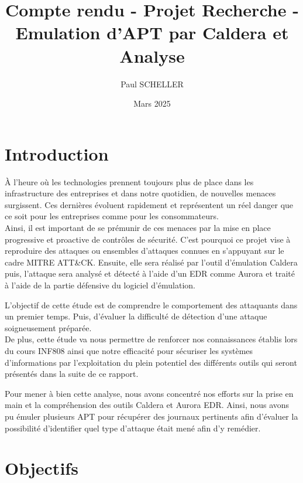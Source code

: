 \documentclass[12pt,letterpaper]{article}
\title{Compte rendu - Projet Recherche - Emulation d'APT par Caldera et Analyse}
\author{Paul SCHELLER}
\date{Mars 2025}
\begin{document}



\newpage
\renewcommand{\contentsname}{Plan de l'étude}
\tableofcontents


\newpage
\section{Introduction}

À l'heure où les technologies prennent toujours plus de place dans les infrastructure des entreprises et dans notre quotidien, de nouvelles menaces surgissent. Ces dernières évoluent rapidement et représentent un réel danger que ce soit pour les entreprises comme pour les consommateurs. \\
Ainsi, il est important de se prémunir de ces menaces par la mise en place progressive et proactive de contrôles de sécurité. C'est pourquoi ce projet vise à reproduire des attaques ou ensembles d'attaques connues en s'appuyant sur le cadre MITRE ATT\&CK. Ensuite, elle sera réalisé par l'outil d'émulation Caldera puis, l'attaque sera analysé et détecté à l'aide d'un EDR comme Aurora et traité à l'aide de la partie défensive du logiciel d'émulation.

\bigskip

L'objectif de cette étude est de comprendre le comportement des attaquants dans un premier temps. Puis, d'évaluer la difficulté de détection d'une attaque soigneusement préparée. \\
De plus, cette étude va nous permettre de renforcer nos connaissances établis lors du cours INF808 ainsi que notre efficacité pour sécuriser les systèmes d'informations par l'exploitation du plein potentiel des différents outils qui seront présentés dans la suite de ce rapport.

\bigskip

Pour mener à bien cette analyse, nous avons concentré nos efforts sur la prise en main et la compréhension des outils Caldera et Aurora EDR. Ainsi, nous avons pu émuler plusieurs APT pour récupérer des journaux pertinents afin d'évaluer la possibilité d'identifier quel type d'attaque était mené afin d'y remédier.

\newpage
\section{Objectifs}
\end{document}
